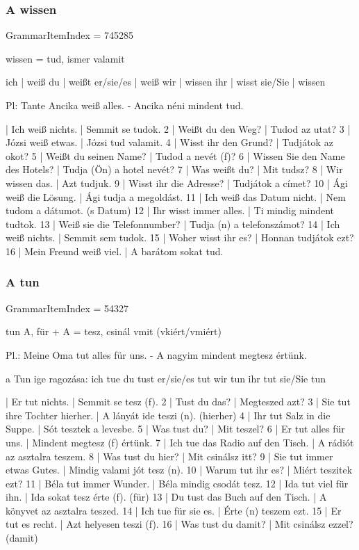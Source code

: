 \documentclass{article}
\newenvironment{desc}{\verbatim}{\endverbatim}
\newenvironment{exmp}{\verbatim}{\endverbatim}
\begin{document}
\subsubsection{A wissen}

GrammarItemIndex = 745285

\begin{desc}
wissen = tud, ismer valamit

ich       | weiß
du        | weißt
er/sie/es | weiß
wir       | wissen
ihr       | wisst
sie/Sie   | wissen

Pl: Tante Ancika weiß alles. - Ancika néni mindent tud.
\end{desc}

\begin{exmp}
1 | Ich weiß nichts. | Semmit se tudok.
2 | Weißt du den Weg? | Tudod az utat?
3 | Józsi weiß etwas. | Józsi tud valamit.
4 | Wisst ihr den Grund? | Tudjátok az okot?
5 | Weißt du seinen Name? | Tudod a nevét (f)?
6 | Wissen Sie den Name des Hotels? | Tudja (Ön) a hotel nevét?
7 | Was weißt du? | Mit tudsz?
8 | Wir wissen das. | Azt tudjuk.
9 | Wisst ihr die Adresse? | Tudjátok a címet?
10 | Ági weiß die Lösung. | Ági tudja a megoldást.
11 | Ich weiß das Datum nicht. | Nem tudom a dátumot. (s Datum)
12 | Ihr wisst immer alles. | Ti mindig mindent tudtok.
13 | Weiß sie die Telefonnumber? | Tudja (n) a telefonszámot?
14 | Ich weiß nichts. | Semmit sem tudok.
15 | Woher wisst ihr es? | Honnan tudjátok ezt?
16 | Mein Freund weiß viel. | A barátom sokat tud.
\end{exmp}

\subsubsection{A tun}

GrammarItemIndex = 54327

\begin{desc}
tun A, für + A = tesz, csinál vmit (vkiért/vmiért)

Pl.: Meine Oma tut alles für uns. - A nagyim mindent megtesz értünk.

a Tun ige ragozása:
ich tue
du tust
er/sie/es tut
wir tun
ihr tut
sie/Sie tun
\end{desc}

\begin{exmp}
1 | Er tut nichts. | Semmit se tesz (f).
2 | Tust du das? | Megteszed azt?
3 | Sie tut ihre Tochter hierher. | A lányát ide teszi (n). (hierher)
4 | Ihr tut Salz in die Suppe. | Sót tesztek a levesbe.
5 | Was tust du? | Mit teszel?
6 | Er tut alles für uns. | Mindent megtesz (f) értünk.
7 | Ich tue das Radio auf den Tisch. | A rádiót az asztalra teszem.
8 | Was tust du hier? | Mit csinálsz itt?
9 | Sie tut immer etwas Gutes. | Mindig valami jót tesz (n).
10 | Warum tut ihr es? | Miért teszitek ezt?
11 | Béla tut immer Wunder. | Béla mindig csodát tesz.
12 | Ida tut viel für ihn. | Ida sokat tesz érte (f). (für)
13 | Du tust das Buch auf den Tisch. | A könyvet az asztalra teszed.
14 | Ich tue für sie es. | Érte (n) teszem ezt.
15 | Er tut es recht. | Azt helyesen teszi (f).
16 | Was tust du damit? | Mit csinálsz ezzel? (damit)
\end{exmp}
\end{document}
